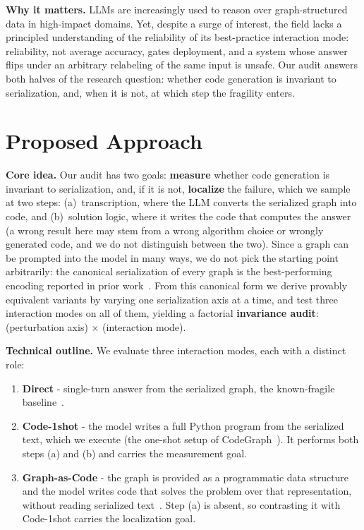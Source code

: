 \documentclass[10pt,a4paper]{article}
\newcommand{\head}[1]{\vspace{0.35em}\noindent\textbf{#1}\hspace{0.5em}}
\begin{document}
\head{Why it matters.} LLMs are increasingly used to reason over graph-structured data in high-impact domains. Yet, despite a surge of interest, the field lacks a principled understanding of the reliability of its best-practice interaction mode: reliability, not average accuracy, gates deployment, and a system whose answer flips under an arbitrary relabeling of the same input is unsafe. Our audit answers both halves of the research question: whether code generation is invariant to serialization, and, when it is not, at which step the fragility enters.

\section{Proposed Approach}

\head{Core idea.} Our audit has two goals: \textbf{measure} whether code generation is invariant to serialization, and, if it is not, \textbf{localize} the failure, which we sample at two steps: (a)~transcription, where the LLM converts the serialized graph into code, and (b)~solution logic, where it writes the code that computes the answer (a wrong result here may stem from a wrong algorithm choice or wrongly generated code, and we do not distinguish between the two). Since a graph can be prompted into the model in many ways, we do not pick the starting point arbitrarily: the canonical serialization of every graph is the best-performing encoding reported in prior work~\cite{fatemi}. From this canonical form we derive provably equivalent variants by varying one serialization axis at a time, and test three interaction modes on all of them, yielding a factorial \textbf{invariance audit}: (perturbation axis) $\times$ (interaction mode).

\head{Technical outline.} We evaluate three interaction modes, each with a distinct role:

\begin{enumerate}[label=\textbf{M\arabic*.},leftmargin=2.6em]
\item \textbf{Direct} - single-turn answer from the serialized graph, the known-fragile baseline~\cite{herbst}.
\item \textbf{Code-1shot} - the model writes a full Python program from the serialized text, which we execute (the one-shot setup of CodeGraph~\cite{cai}). It performs both steps (a) and (b) and carries the measurement goal.
\item \textbf{Graph-as-Code} - the graph is provided as a programmatic data structure and the model writes code that solves the problem over that representation, without reading serialized text~\cite{finkelshtein}. Step (a) is absent, so contrasting it with Code-1shot carries the localization goal.
\end{enumerate}
\end{document}
